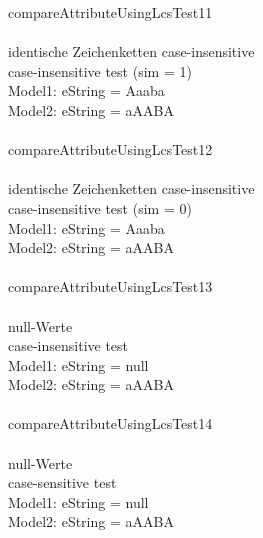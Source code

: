 compareAttributeUsingLcsTest11\\\\
identische Zeichenketten case-insensitive\\
case-insensitive test (sim = 1)\\
Model1: eString = Aaaba\\
Model2: eString = aAABA\\\\

compareAttributeUsingLcsTest12\\\\
identische Zeichenketten case-insensitive\\
case-insensitive test (sim = 0)\\
Model1: eString = Aaaba\\
Model2: eString = aAABA\\\\

compareAttributeUsingLcsTest13\\\\
null-Werte\\
case-insensitive test\\
Model1: eString = null\\
Model2: eString = aAABA\\\\

compareAttributeUsingLcsTest14\\\\
null-Werte\\
case-sensitive test\\
Model1: eString = null\\
Model2: eString = aAABA\\